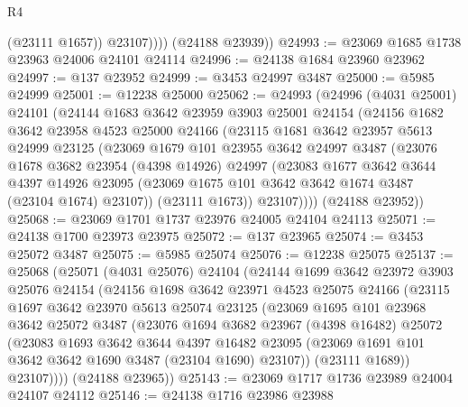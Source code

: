 \begin{lexlean}{R4}
\begin{coremodule}
                (@23111 @1657))
              @23107))))
      (@24188 @23939))
@24993 := @23069 @1685 @1738 @23963 @24006 @24101 @24114
@24996 := @24138 @1684 @23960 @23962
@24997 := @137 @23952
@24999 := @3453 @24997 @3487
@25000 := @5985 @24999
@25001 := @12238 @25000
@25062 := @24993
    (@24996
      (@4031 @25001)
      @24101
      (@24144
        @1683
        @3642
        @23959
        @3903
        @25001
        @24154
        (@24156
          @1682
          @3642
          @23958
          @4523
          @25000
          @24166
          (@23115
            @1681
            @3642
            @23957
            @5613
            @24999
            @23125
            (@23069
              @1679
              @101
              @23955
              @3642
              @24997
              @3487
              (@23076
                @1678
                @3682
                @23954
                (@4398 @14926)
                @24997
                (@23083
                  @1677
                  @3642
                  @3644
                  @4397
                  @14926
                  @23095
                  (@23069 @1675 @101 @3642 @3642 @1674 @3487 (@23104 @1674) @23107))
                (@23111 @1673))
              @23107))))
      (@24188 @23952))
@25068 := @23069 @1701 @1737 @23976 @24005 @24104 @24113
@25071 := @24138 @1700 @23973 @23975
@25072 := @137 @23965
@25074 := @3453 @25072 @3487
@25075 := @5985 @25074
@25076 := @12238 @25075
@25137 := @25068
    (@25071
      (@4031 @25076)
      @24104
      (@24144
        @1699
        @3642
        @23972
        @3903
        @25076
        @24154
        (@24156
          @1698
          @3642
          @23971
          @4523
          @25075
          @24166
          (@23115
            @1697
            @3642
            @23970
            @5613
            @25074
            @23125
            (@23069
              @1695
              @101
              @23968
              @3642
              @25072
              @3487
              (@23076
                @1694
                @3682
                @23967
                (@4398 @16482)
                @25072
                (@23083
                  @1693
                  @3642
                  @3644
                  @4397
                  @16482
                  @23095
                  (@23069 @1691 @101 @3642 @3642 @1690 @3487 (@23104 @1690) @23107))
                (@23111 @1689))
              @23107))))
      (@24188 @23965))
@25143 := @23069 @1717 @1736 @23989 @24004 @24107 @24112
@25146 := @24138 @1716 @23986 @23988

\end{coremodule}
\end{lexlean}
